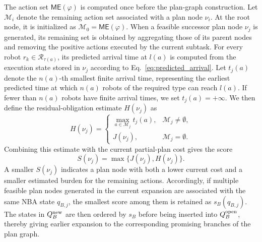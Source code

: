 \documentclass[lettersize,journal]{IEEEtran}
\theoremstyle{italiclemma}
\theoremstyle{italiclemma}
\theoremstyle{definition}
\begin{document}
The action set $\mathsf{ME}(\varphi)$ is computed once before the plan-graph construction. Let $\mathcal M_i$ denote the remaining action set associated with a plan node $\nu_i$. At the root node, it is initialized as $\mathcal M_0=\mathsf{ME}(\varphi)$. When a feasible successor plan node $\nu_j$ is generated, its remaining set is obtained by aggregating those of its parent nodes and removing the positive actions executed by the current subtask. For every robot $r_k\in\mathcal R_{\tau(a)}$, its predicted arrival time at $l(a)$ is computed from the execution state stored in $\nu_j$ according to Eq.~\eqref{eq:predicted_arrival}. Let $t_j(a)$ denote the $n(a)$-th smallest finite arrival time, representing the earliest predicted time at which $n(a)$ robots of the required type can reach $l(a)$. If fewer than $n(a)$ robots have finite arrival times, we set $t_j(a)=+\infty$. We then define the residual-obligation estimate $H(\nu_j)$ as
\begin{equation}
H(\nu_j)=
\begin{cases}
\displaystyle
\max_{a\in\mathcal M_j} t_j(a),
& \mathcal M_j\neq\emptyset,\\[2mm]
J(\nu_j),
& \mathcal M_j=\emptyset.
\end{cases}
\label{eq:residual_pressure}
\end{equation}
Combining this estimate with the current partial-plan cost gives the score
\begin{equation}
S(\nu_j) = \max\{J(\nu_j),H(\nu_j)\}.
\label{eq:score}
\end{equation}
A smaller $S(\nu_j)$ indicates a plan node with both a lower current cost and a smaller estimated burden for the remaining actions. Accordingly, if multiple feasible plan nodes generated in the current expansion are associated with the same NBA state $q_{B,j}$, the smallest score among them is retained as $s_B(q_{B,j})$. The states
in $Q_B^{\rm new}$ are then ordered by $s_B$ before being inserted into $Q_B^{\rm open}$, thereby giving earlier expansion to the corresponding promising branches of the plan graph.

\end{document}
